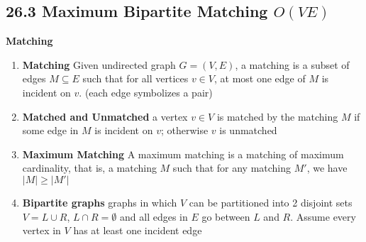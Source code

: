 \documentclass[11pt]{article}
\begin{document}
\subsection*{26.3 Maximum Bipartite Matching $O(VE)$}

\begin{defn*} \textbf{Matching}
    \begin{enumerate}
        \item \textbf{Matching} Given undirected graph $G = (V,E)$, a matching is a subset of edges $M\subseteq E$ such that for all vertices $v\in V$, at most one edge of $M$ is incident on $v$. (each edge symbolizes a pair)
        \item \textbf{Matched and Unmatched} a vertex $v\in V$ is matched by the matching $M$ if some edge in $M$ is incident on $v$; otherwise $v$ is unmatched
        \item \textbf{Maximum Matching} A maximum matching is a matching of maximum cardinality, that is, a matching $M$ such that for any matching $M'$, we have $|M | \geq |M'|$
        \item \textbf{Bipartite graphs} graphs in which $V$ can be partitioned into 2 disjoint sets $V = L\cup R$, $L\cap R = \emptyset$ and all edges in $E$ go between $L$ and $R$. Assume every vertex in $V$ has at least one incident edge
    \end{enumerate}
\end{defn*}
\end{document}
